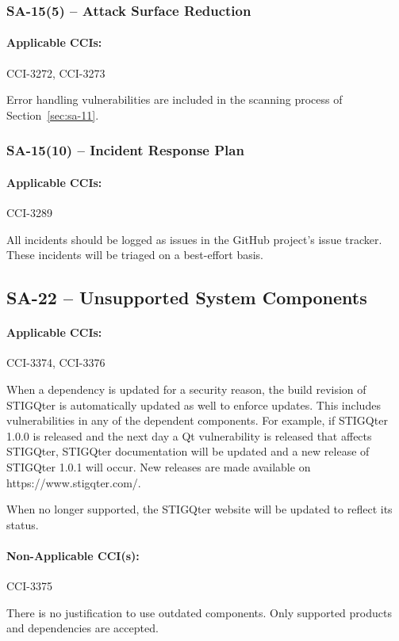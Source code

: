 \documentclass[letterpaper, 10pt, twoside]{article}
\begin{document}
\subsubsection{SA-15(5) -- Attack Surface Reduction}

\paragraph{Applicable CCIs:} CCI-3272, CCI-3273

Error handling vulnerabilities are included in the scanning process of Section~\ref{sec:sa-11}.

\subsubsection{SA-15(10) -- Incident Response Plan}

\paragraph{Applicable CCIs:} CCI-3289

All incidents should be logged as issues in the GitHub project's issue tracker. These incidents will be triaged on a best-effort basis.

\subsection{SA-22 -- Unsupported System Components}

\paragraph{Applicable CCIs:} CCI-3374, CCI-3376

When a dependency is updated for a security reason, the build revision of STIGQter is automatically updated as well to enforce updates. This includes vulnerabilities in any of the dependent components. For example, if STIGQter 1.0.0 is released and the next day a Qt vulnerability is released that affects STIGQter, STIGQter documentation will be updated and a new release of STIGQter 1.0.1 will occur. New releases are made available on https://www.stigqter.com/.

When no longer supported, the STIGQter website will be updated to reflect its status.

\paragraph{Non-Applicable CCI(s):} CCI-3375

There is no justification to use outdated components. Only supported products and dependencies are accepted.

\clearpage
\printbibliography
\end{document}
